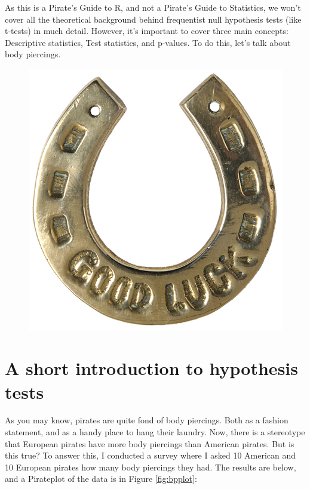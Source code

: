 \documentclass[]{book}
\theoremstyle{definition}
\theoremstyle{definition}
\theoremstyle{remark}
\begin{document}
As this is a Pirate's Guide to R, and not a Pirate's Guide to
Statistics, we won't cover all the theoretical background behind
frequentist null hypothesis tests (like t-tests) in much detail.
However, it's important to cover three main concepts: Descriptive
statistics, Test statistics, and p-values. To do this, let's talk about
body piercings.

\begin{figure}

{\centering \includegraphics[width=0.4\linewidth]{images/horseshoe} 

}

\end{figure}

\section{A short introduction to hypothesis
tests}\label{a-short-introduction-to-hypothesis-tests}

As you may know, pirates are quite fond of body piercings. Both as a
fashion statement, and as a handy place to hang their laundry. Now,
there is a stereotype that European pirates have more body piercings
than American pirates. But is this true? To answer this, I conducted a
survey where I asked 10 American and 10 European pirates how many body
piercings they had. The results are below, and a Pirateplot of the data
is in Figure \ref{fig:bpplot}:
\end{document}
